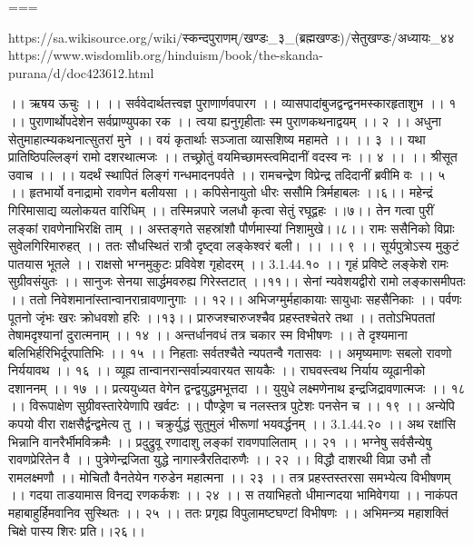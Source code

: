 ===

https://sa.wikisource.org/wiki/स्कन्दपुराणम्/खण्डः_३_(ब्रह्मखण्डः)/सेतुखण्डः/अध्यायः_४४
https://www.wisdomlib.org/hinduism/book/the-skanda-purana/d/doc423612.html

।। ऋषय ऊचुः ।। ।।
सर्ववेदार्थतत्त्वज्ञ पुराणार्णवपारग ।।
व्यासपादांबुजद्वन्द्वनमस्कारहृताशुभ ।। १ ।।
पुराणार्थोपदेशेन सर्वप्राण्युपका रक ।।
त्वया ह्यनुगृहीताः स्म पुराणकथनाद्वयम् ।। २ ।।
अधुना सेतुमाहात्म्यकथनात्सुतरां मुने ।।
वयं कृतार्थाः सञ्जाता व्यासशिष्य महामते ।। ।। ३ ।।
यथा प्रातिष्ठिपल्लिङ्गं रामो दशरथात्मजः ।।
तच्छ्रोतुं वयमिच्छामस्त्वमिदानीं वदस्व नः ।। ४ ।।
।। श्रीसूत उवाच ।। ।।
यदर्थं स्थापितं लिङ्गं गन्धमादनपर्वते ।।
रामचन्द्रेण विप्रेन्द्र तदिदानीं ब्रवीमि वः ।। ५ ।।
हृतभार्यो वनाद्रामो रावणेन बलीयसा ।।
कपिसेनायुतो धीरः ससौमि त्रिर्महाबलः ।।६।।
महेन्द्रं गिरिमासाद्य व्यलोकयत वारिधिम् ।।
तस्मिन्नपारे जलधौ कृत्वा सेतुं रघूद्वहः ।।७।।
तेन गत्वा पुरीं लङ्कां रावणेनाभिरक्षि ताम् ।।
अस्तङ्गते सहस्रांशौ पौर्णमास्यां निशामुखे।।८।।
रामः ससैनिको विप्राः सुवेलगिरिमारुहत् ।।
ततः सौधस्थितं रात्रौ दृष्ट्वा लङ्केश्वरं बली। ।। ।। ९ ।।
सूर्यपुत्रोऽस्य मुकुटं पातयास भूतले ।।
राक्षसो भग्नमुकुटः प्रविवेश गृहोदरम् ।। 3.1.44.१० ।।
गृहं प्रविष्टे लङ्केशे रामः सुग्रीवसंयुतः ।।
सानुजः सेनया सार्द्धमवरुह्य गिरेस्तटात् ।।११।।
सेनां न्यवेशयद्वीरो रामो लङ्कासमीपतः ।।
ततो निवेशमानांस्तान्वानरान्रावणानुगाः ।। १२।।
अभिजग्मुर्महाकायाः सायुधाः सहसैनिकाः ।।
पर्वणः पूतनो जृंभः खरः क्रोधवशो हरिः ।।१३।।
प्रारुजश्चारुजश्चैव प्रहस्तश्चेतरे तथा ।।
ततोऽभिपततां तेषामदृश्यानां दुरात्मनाम् ।। १४ ।।
अन्तर्धानवधं तत्र चकार स्म विभीषणः ।।
ते दृश्यमाना बलिभिर्हरिभिर्दूरपातिभिः ।। १५ ।।
निहताः सर्वतश्चैते न्यपतन्वै गतासवः ।।
अमृष्यमाणः सबलो रावणो निर्ययावथ ।। १६ ।।
व्यूह्य तान्वानरान्सर्वान्न्यवारयत सायकैः ।।
राघवस्त्वथ निर्याय व्यूढानीको दशाननम् ।। १७ ।।
प्रत्ययुध्यत वेगेन द्वन्द्वयुद्धमभूत्तदा ।।
युयुधे लक्ष्मणेनाथ इन्द्रजिद्रावणात्मजः ।। १८ ।।
विरूपाक्षेण सुग्रीवस्तारेयेणापि खर्वटः ।।
पौण्ड्रेण च नलस्तत्र पुटेशः पनसेन च ।। १९ ।।
अन्येपि कपयो वीरा राक्षसैर्द्वन्द्वमेत्य तु ।।
चक्रुर्युद्धं सुतुमुलं भीरूणां भयवर्द्धनम् ।। 3.1.44.२० ।।
अथ रक्षांसि भिन्नानि वानरैर्भीमविक्रमैः ।।
प्रदुद्रुवू रणादाशु लङ्कां रावणपालिताम् ।। २१ ।।
भग्नेषु सर्वसैन्येषु रावणप्रेरितेन वै ।।
पुत्रेणेन्द्रजिता युद्धे नागास्त्रैरतिदारुणैः ।। २२ ।।
विद्धौ दाशरथी विप्रा उभौ तौ रामलक्ष्मणौ ।।
मोचितौ वैनतेयेन गरुडेन महात्मना ।। २३ ।।
तत्र प्रहस्तस्तरसा समभ्येत्य विभीषणम् ।।
गदया ताडयामास विनद्य रणकर्कशः ।। २४ ।।
स तयाभिहतो धीमान्गदया भामिवेगया ।।
नाकंपत महाबाहुर्हिमवानिव सुस्थितः ।। २५ ।।
ततः प्रगृह्य विपुलामष्टघण्टां विभीषणः ।।
अभिमन्त्र्य महाशक्तिं चिक्षे पास्य शिरः प्रति।।२६।।
